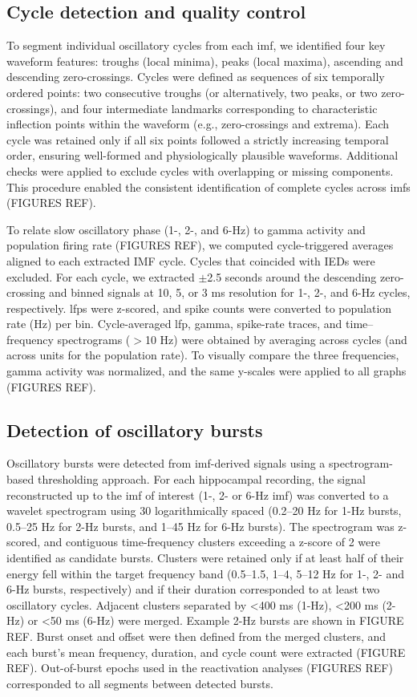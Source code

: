 \documentclass[12pt,a4paper]{report}
\newcommand{\g}[1]{\gls{#1}}     %
\newcommand{\gp}[1]{\glspl{#1}}  %
\begin{document}
\subsection{Cycle detection and quality control}
To segment individual oscillatory cycles from each \g{imf}, we identified four key waveform features: troughs (local minima), peaks (local maxima), ascending and descending zero-crossings. Cycles were defined as sequences of six temporally ordered points: two consecutive troughs (or alternatively, two peaks, or two zero-crossings), and four intermediate landmarks corresponding to characteristic inflection points within the waveform (e.g., zero-crossings and extrema). Each cycle was retained only if all six points followed a strictly increasing temporal order, ensuring well-formed and physiologically plausible waveforms. Additional checks were applied to exclude cycles with overlapping or missing components. This procedure enabled the consistent identification of complete cycles across \gp{imf} (FIGURES REF).

To relate slow oscillatory phase (1-, 2-, and 6-Hz) to gamma activity and population firing rate (FIGURES REF), we computed cycle-triggered averages aligned to each extracted IMF cycle. Cycles that coincided with IEDs were excluded. For each cycle, we extracted $\pm$2.5 seconds around the descending zero-crossing and binned signals at 10, 5, or 3 ms resolution for 1-, 2-, and 6-Hz cycles, respectively. \gp{lfp} were z-scored, and spike counts were converted to population rate (Hz) per bin. Cycle-averaged \g{lfp}, gamma, spike-rate traces, and time–frequency spectrograms ($>$10 Hz) were obtained by averaging across cycles (and across units for the population rate). To visually compare the three frequencies, gamma activity was normalized, and the same y-scales were applied to all graphs (FIGURES REF).

\subsection{Detection of oscillatory bursts}
Oscillatory bursts were detected from \g{imf}-derived signals using a spectrogram-based thresholding approach. For each hippocampal recording, the signal reconstructed up to the \g{imf} of interest (1-, 2- or 6-Hz \g{imf}) was converted to a wavelet spectrogram using 30 logarithmically spaced (0.2–20 Hz for 1-Hz bursts, 0.5–25 Hz for 2-Hz bursts, and 1–45 Hz for 6-Hz bursts). The spectrogram was z-scored, and contiguous time-frequency clusters exceeding a z-score of 2 were identified as candidate bursts. Clusters were retained only if at least half of their energy fell within the target frequency band (0.5–1.5, 1–4, 5–12 Hz for 1-, 2- and 6-Hz bursts, respectively) and if their duration corresponded to at least two oscillatory cycles. Adjacent clusters separated by <400 ms (1-Hz), <200 ms (2-Hz) or <50 ms (6-Hz) were merged. Example 2-Hz bursts are shown in FIGURE REF. Burst onset and offset were then defined from the merged clusters, and each burst’s mean frequency, duration, and cycle count were extracted (FIGURE REF). Out-of-burst epochs used in the reactivation analyses (FIGURES REF) corresponded to all segments between detected bursts.
\end{document}
